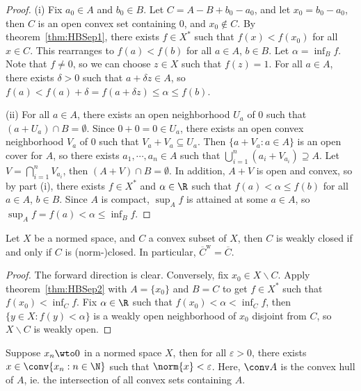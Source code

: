 \documentclass[a4paper]{article}
\begin{document}
\begin{proof}
  (i) Fix $a_0\in A$ and $b_0\in B$. Let $C=A-B+b_0-a_0$, and let $x_0=b_0-a_0$, then $C$ is an open convex set containing 0, and $x_0\notin C$. By theorem~\ref{thm:HBSep1}, there exists $f\in X^*$ such that $f(x)<f(x_0)$ for all $x\in C$. This rearranges to $f(a)<f(b)$ for all $a\in A$, $b\in B$. Let $\alpha=\inf_B f$. Note that $f\not= 0$, so we can choose $z\in X$ such that $f(z)=1$. For all $a\in A$, there exists $\delta>0$ such that $a+\delta z\in A$, so $f(a)<f(a)+\delta=f(a+\delta z)\leq\alpha\leq f(b)$.

  (ii) For all $a\in A$, there exists an open neighborhood $U_a$ of 0 such that $(a+U_a)\cap B=\emptyset$. Since $0+0=0\in U_a$, there exists an open convex neighborhood $V_a$ of 0 such that $V_a+V_a\subseteq U_a$. Then $\{a+V_a:a\in A\}$ is an open cover for $A$, so there exists $a_1,\cdots,a_n\in A$ such that $\bigcup_{i=1}^n(a_i+V_{a_i})\supseteq A$. Let $V=\bigcap_{i=1}^n V_{a_i}$, then $(A+V)\cap B=\emptyset$. In addition, $A+V$ is open and convex, so by part (i), there exists $f\in X^*$ and $\alpha\in\R$ such that $f(a)<\alpha\leq f(b)$ for all $a\in A$, $b\in B$. Since $A$ is compact, $\sup_A f$ is attained at some $a\in A$, so $\sup_A f=f(a)<\alpha\leq\inf_B f$.
\end{proof}

\begin{nthm}\label{thm:MazurWeakClosure}
  Let $X$ be a normed space, and $C$ a convex subset of $X$, then $C$ is weakly closed if and only if $C$ is (norm-)closed. In particular, $\overline{C}^\mathrm{w}=\overline{C}$.
\end{nthm}

\begin{proof}
  The forward direction is clear. Conversely, fix $x_0\in X\backslash C$. Apply theorem~\ref{thm:HBSep2} with $A=\{x_0\}$ and $B=C$ to get $f\in X^*$ such that $f(x_0)<\inf_C f$. Fix $\alpha\in\R$ such that $f(x_0)<\alpha<\inf_C f$, then $\{y\in X:f(y)<\alpha\}$ is a weakly open neighborhood of $x_0$ disjoint from $C$, so $X\backslash C$ is weakly open.
\end{proof}

\begin{ncor}\label{cor:MazurWeaklyNull}
  Suppose $x_n\wto 0$ in a normed space $X$, then for all $\varepsilon>0$, there exists $x\in\conv\{x_n:n\in\N\}$ such that $\norm{x}<\varepsilon$. Here, $\conv A$ is the convex hull of $A$, ie. the intersection of all convex sets containing $A$.
\end{ncor}
\end{document}
